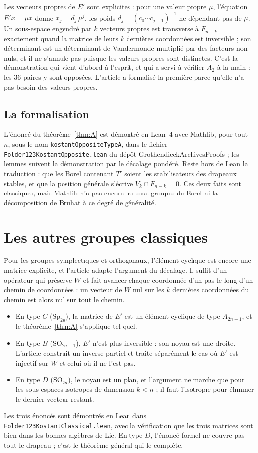 \documentclass[11pt,a4paper]{amsart}
\theoremstyle{definition}
\theoremstyle{plain}
\theoremstyle{remark}
\begin{document}
Les vecteurs propres de $E'$ sont explicites : pour une valeur propre $\mu$, l'équation $E'x = \mu x$ donne $x_j = d_j\, \mu^j$, les poids $d_j = (c_0 \cdots c_{j-1})^{-1}$ ne dépendant pas de $\mu$. Un sous-espace engendré par $k$ vecteurs propres est transverse à $F_{n-k}$ exactement quand la matrice de leurs $k$ dernières coordonnées est inversible ; son déterminant est un déterminant de Vandermonde multiplié par des facteurs non nuls, et il ne s'annule pas puisque les valeurs propres sont distinctes. C'est la démonstration qui vient d'abord à l'esprit, et qui a servi à vérifier $A_2$ à la main : les $36$ paires y sont opposées. L'article a formalisé la première parce qu'elle n'a pas besoin des valeurs propres.

\subsection{La formalisation}

L'énoncé du théorème~\ref{thm:A} est démontré en Lean~4 avec Mathlib, pour tout $n$, sous le nom \texttt{kostantOppositeTypeA}, dans le fichier \texttt{Folder123KostantOpposite.lean} du dépôt GrothendieckArchivesProofs ; les lemmes suivent la démonstration par le décalage pondéré. Reste hors de Lean la traduction : que les Borel contenant $T'$ soient les stabilisateurs des drapeaux stables, et que la position générale s'écrive $V_k \cap F_{n-k} = 0$. Ces deux faits sont classiques, mais Mathlib n'a pas encore les sous-groupes de Borel ni la décomposition de Bruhat à ce degré de généralité.

\section{Les autres groupes classiques}

Pour les groupes symplectiques et orthogonaux, l'élément cyclique est encore une matrice explicite, et l'article adapte l'argument du décalage. Il suffit d'un opérateur qui préserve $W$ et fait avancer chaque coordonnée d'un pas le long d'un chemin de coordonnées : un vecteur de $W$ nul sur les $k$ dernières coordonnées du chemin est alors nul sur tout le chemin.
\begin{itemize}
\item En type $C$ ($\mathrm{Sp}_{2n}$), la matrice de $E'$ est un élément cyclique de type $A_{2n-1}$, et le théorème~\ref{thm:A} s'applique tel quel.
\item En type $B$ ($\mathrm{SO}_{2n+1}$), $E'$ n'est plus inversible : son noyau est une droite. L'article construit un inverse partiel et traite séparément le cas où $E'$ est injectif sur $W$ et celui où il ne l'est pas.
\item En type $D$ ($\mathrm{SO}_{2n}$), le noyau est un plan, et l'argument ne marche que pour les sous-espaces isotropes de dimension $k < n$ ; il faut l'isotropie pour éliminer le dernier vecteur restant.
\end{itemize}
Les trois énoncés sont démontrés en Lean dans \texttt{Folder123KostantClassical.lean}, avec la vérification que les trois matrices sont bien dans les bonnes algèbres de Lie. En type $D$, l'énoncé formel ne couvre pas tout le drapeau ; c'est le théorème général qui le complète.
\end{document}
